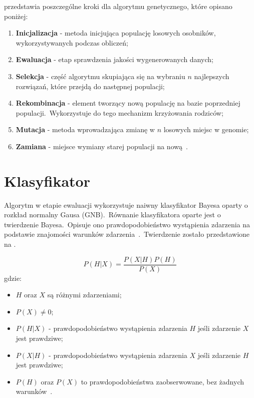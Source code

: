 przedstawia poszczególne kroki dla algorytmu genetycznego, które opisano poniżej:\
\begin{enumerate}
    \item \textbf{Inicjalizacja} - metoda inicjująca populację losowych osobników, wykorzystywanych podczas obliczeń;
    \item \textbf{Ewaluacja} - etap sprawdzenia jakości wygenerowanych danych;
    \item \textbf{Selekcja} - część algorytmu skupiająca się na wybraniu $n$ najlepszych rozwiązań, które przejdą do następnej populacji;
    \item \textbf{Rekombinacja} - element tworzący nową populację na bazie poprzedniej populacji.\ Wykorzystuje do tego mechanizm krzyżowania rodziców;
    \item \textbf{Mutacja} - metoda wprowadzająca zmianę w $n$ losowych miejsc w genomie;
    \item \textbf{Zamiana} - miejsce wymiany starej populacji na nową~\cite{Sastry2005, Kusiak2021, Blyszcz2022}.
\end{enumerate}

\section{Klasyfikator}
Algorytm w etapie ewaluacji wykorzystuje naiwny klasyfikator Bayesa oparty o rozkład normalny Gausa  (GNB).\ Równanie klasyfikatora oparte jest o twierdzenie Bayesa.\ Opisuje ono prawdopodobieństwo wystąpienia zdarzenia na podstawie znajomości warunków zdarzenia~\cite{Joyce2003}.\ Twierdzenie zostało przedstawione na .

\begin{equation}\label{math:bayes}
P(H|X) = \frac{P(X|H) P(H)}{P(X)}
\end{equation}
gdzie:
\begin{itemize}
    \item $H$ oraz $X$ są różnymi zdarzeniami;
    \item $P(X) \neq 0$;
    \item $P(H|X)$ - prawdopodobieństwo wystąpienia zdarzenia $H$ jeśli zdarzenie $X$ jest prawdziwe;
    \item $P(X|H)$ - prawdopodobieństwo wystąpienia zdarzenia $X$ jeśli zdarzenie $H$ jest prawdziwe;
    \item $P(H)$ oraz $P(X)$ to prawdopodobieństwa zaobserwowane, bez żadnych warunków~\cite{Leung2007}.
\end{itemize}

